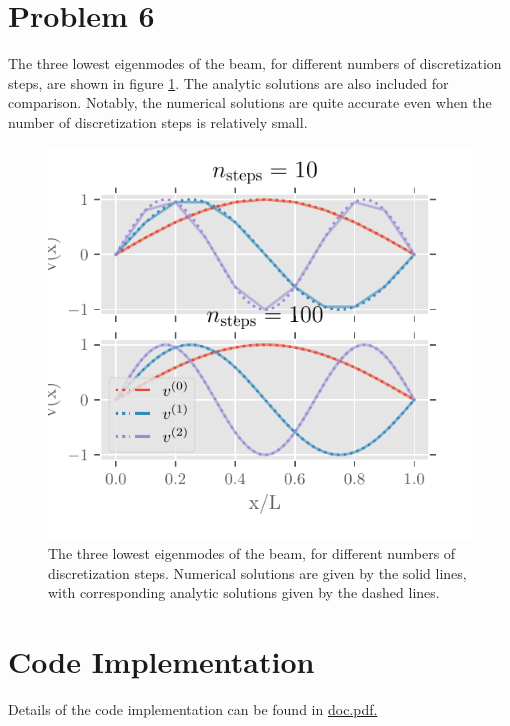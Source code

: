 \documentclass[english,notitlepage,reprint,nofootinbib]{revtex4-2}  %
\begin{document}
\section{Problem 6}
The three lowest eigenmodes of the beam, for different numbers of discretization steps, are shown in figure \ref{fig:eigenvectors}. 
The analytic solutions are also included for comparison.
Notably, the numerical solutions are quite accurate even when the number of discretization steps is relatively small.
\begin{figure}
    \centering
    \includegraphics{Code/output/eigenvectors.pdf}
    \caption{The three lowest eigenmodes of the beam, for different numbers of discretization steps.
    Numerical solutions are given by the solid lines, with corresponding analytic solutions given by the dashed lines.}
    \label{fig:eigenvectors}
\end{figure}

\section{Code Implementation}
Details of the code implementation can be found in \href{https://github.com/isakrukan/FYS4150/blob/main/Project2/docs/doc.pdf}{doc.pdf.}



\onecolumngrid
% 


\end{document}
